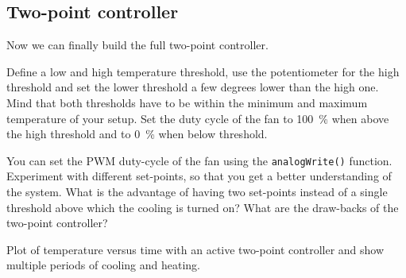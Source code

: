 \subsection{Two-point controller}\label{sec:cool2}
Now we can finally build the full two-point controller.\par
%
\begin{task}
  Define a low and high temperature threshold, \eg use the potentiometer for the high threshold and set the lower threshold a few degrees lower than the high one. Mind that both thresholds have to be within the minimum and maximum temperature of your setup. Set the duty cycle of the fan to \SI{100}{\percent} when above the high threshold and to \SI{0}{\percent} when below threshold.
\end{task}
%
You can set the \ac{PWM} duty-cycle of the fan using the \texttt{analogWrite()} function. Experiment with different set-points, so that you get a better understanding of the system. What is the advantage of having two set-points instead of a single threshold above which the cooling is turned on? What are the draw-backs of the two-point controller?\par
%
\begin{task}
  Plot of temperature versus time with an active two-point controller and show multiple periods of cooling and heating.
\end{task}
%
